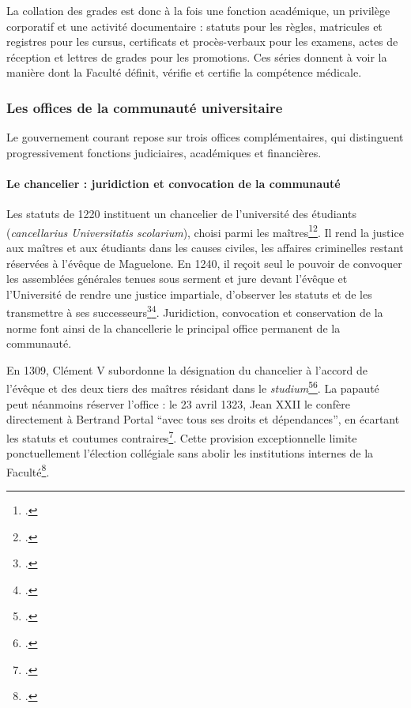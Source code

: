 La collation des grades est donc à la fois une fonction académique, un privilège corporatif et une activité documentaire : statuts pour les règles, matricules et registres pour les cursus, certificats et procès-verbaux pour les examens, actes de réception et lettres de grades pour les promotions. Ces séries donnent à voir la manière dont la Faculté définit, vérifie et certifie la compétence médicale.

\subsubsection{Les offices de la communauté universitaire}

Le gouvernement courant repose sur trois offices complémentaires, qui distinguent progressivement fonctions judiciaires, académiques et financières.

\paragraph{Le chancelier : juridiction et convocation de la communauté}

Les statuts de 1220 instituent un chancelier de l'université des étudiants (\emph{cancellarius Universitatis scolarium}), choisi parmi les maîtres\footcite[fol.~188, vue~187/348]{ADHG1126}\footcite{Conrad1220}. Il rend la justice aux maîtres et aux étudiants dans les causes civiles, les affaires criminelles restant réservées à l'évêque de Maguelone. En 1240, il reçoit seul le pouvoir de convoquer les assemblées générales tenues sous serment et jure devant l'évêque et l'Université de rendre une justice impartiale, d'observer les statuts et de les transmettre à ses successeurs\footcite{AHFMB1}\footcite{Statuts1240}. Juridiction, convocation et conservation de la norme font ainsi de la chancellerie le principal office permanent de la communauté.

En 1309, Clément V subordonne la désignation du chancelier à l'accord de l'évêque et des deux tiers des maîtres résidant dans le \emph{studium}\footcite[fol.~80~r°]{AHFMS1}\footcite{ClementVChancelier1309}. La papauté peut néanmoins réserver l'office : le 23 avril 1323, Jean XXII le confère directement à Bertrand Portal \enquote{avec tous ses droits et dépendances}, en écartant les statuts et coutumes contraires\footcite{JeanXXII1323}. Cette provision exceptionnelle limite ponctuellement l'élection collégiale sans abolir les institutions internes de la Faculté\footcite{Verger1991UniversitesMidi}.

